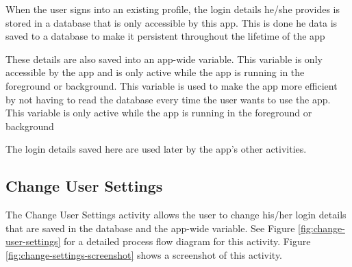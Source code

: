 When the user signs into an existing profile, the login details he/she provides
is stored in a database that is only accessible by this app. This is done he
data is saved to a database to make it persistent throughout the lifetime of the app

These details are also saved into an app-wide variable. This variable is
only accessible by the app and is only active while the app is running in
the foreground or background. This variable is used to make the app more
efficient by not having to read the database every time the user wants to use
the app. This variable is only active while the app is running in the foreground
or background

The login details saved here are used later by the app's other activities.

\subsection{Change User Settings}

The Change User Settings activity allows the user to change his/her login
details that are saved in the database and the app-wide variable. See Figure
\ref{fig:change-user-settings} for a detailed process flow diagram for this
activity. Figure \ref{fig:change-settings-screenshot} shows a screenshot of this
activity.

